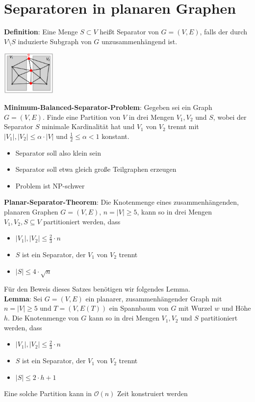 \section{Separatoren in planaren Graphen}

\textbf{Definition}: Eine Menge $S\subset V$ heißt Separator von $G = (V, E)$, falls der durch $V\setminus S$ induzierte Subgraph von $G$ unzusammenhängend ist.

\begin{center}
	\includegraphics[width=0.2\textwidth]{images/separator.png}
\end{center}
\bigskip
\textbf{Minimum-Balanced-Separator-Problem}: Gegeben sei ein Graph $G = (V, E)$. Finde eine Partition von $V$ in drei Mengen $V_1, V_2$ und $S$, wobei der Separator $S$ minimale Kardinalität hat und $V_1$ von $V_2$ trennt mit $|V_1|,|V_2|\leq\alpha\cdot|V|$ und $\frac{1}{2}\leq\alpha<1$ konstant.
\begin{itemize}
	\item Separator soll also klein sein
	\item Separator soll etwa gleich große Teilgraphen erzeugen
	\item Problem ist NP-schwer
\end{itemize}
\bigskip
\textbf{Planar-Separator-Theorem}: Die Knotenmenge eines zusammenhängenden, planaren Graphen $G = (V, E)$, $n = |V| \geq 5$, kann so in drei Mengen $V_1, V_2, S\subseteq V$ partitioniert werden, dass
\begin{itemize}
	\item $|V_1|,|V_2|\leq\frac{2}{3}\cdot n$
	\item $S$ ist ein Separator, der $V_1$ von $V_2$ trennt
	\item $|S| \leq 4\cdot\sqrt{n}$
\end{itemize}

Für den Beweis dieses Satzes benötigen wir folgendes Lemma.\\

\textbf{Lemma}: Sei $G = (V, E)$ ein planarer, zusammenhängender Graph mit $n = |V| \geq 5$ und $T=(V,E(T))$ ein Spannbaum von $G$ mit Wurzel $w$ und Höhe $h$. Die Knotenmenge von $G$ kann so in drei Mengen $V_1, V_2$ und $S$ partitioniert werden, dass
\begin{itemize}
	\item $|V_1|,|V_2|\leq\frac{2}{3}\cdot n$
	\item $S$ ist ein Separator, der $V_1$ von $V_2$ trennt
	\item $|S|\leq 2\cdot h+1$
\end{itemize}
Eine solche Partition kann in $\mathcal{O}(n)$ Zeit konstruiert werden


